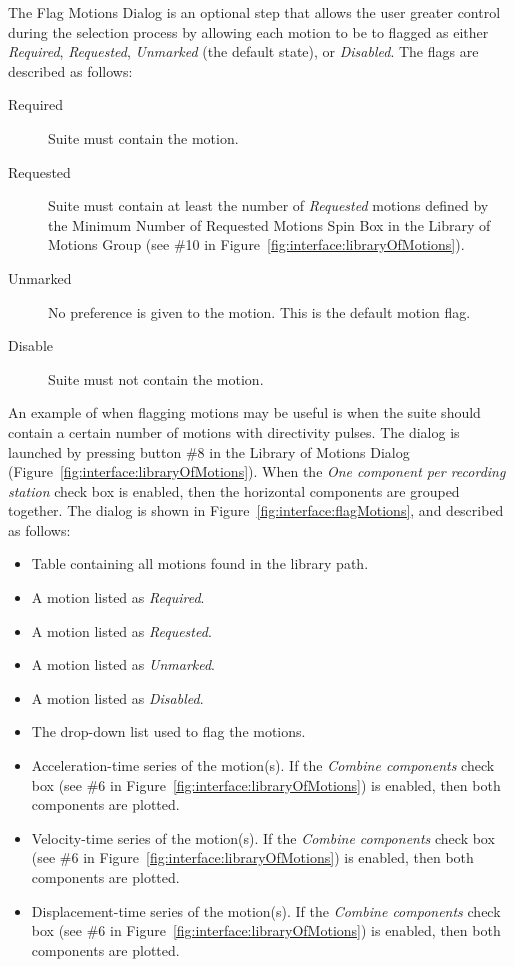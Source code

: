 \documentclass[11pt]{article}
\begin{document}
The Flag Motions Dialog is an optional step that allows the user greater
control during the selection process by allowing each motion to be to flagged as
either \emph{Required}, \emph{Requested}, \emph{Unmarked} (the default state), or
\emph{Disabled}. The flags are described as follows:
\begin{description}
  \item[Required] Suite must contain the motion.
  \item[Requested] Suite must contain at least the number of \emph{Requested} motions
	defined by the Minimum Number of Requested Motions Spin Box in the
	Library of Motions Group (see \#10 in
	Figure~\ref{fig:interface:libraryOfMotions}).
  \item[Unmarked] No preference is given to the motion. This is the default
	motion flag.
  \item[Disable] Suite must not contain the motion.
\end{description}
An example of when flagging motions may be useful is when the suite should
contain a certain number of motions with directivity pulses.  The dialog is
launched by pressing button \#8 in the Library of Motions Dialog
(Figure~\ref{fig:interface:libraryOfMotions}). When the
\emph{One component per recording station} check box is enabled, then the
horizontal components are grouped together. The dialog is shown in
Figure~\ref{fig:interface:flagMotions}, and described as follows:
\begin{itemize}
  \item Table containing all motions found in the library path.
  \item A motion listed as \emph{Required}.
  \item A motion listed as \emph{Requested}.
  \item A motion listed as \emph{Unmarked}.
  \item A motion listed as \emph{Disabled}.
  \item The drop-down list used to flag the motions.
  \item Acceleration-time series of the motion(s). If the \emph{Combine
	components} check box (see \#6 in
	Figure~\ref{fig:interface:libraryOfMotions}) is enabled, then both
	components are plotted.
  \item Velocity-time series of the motion(s). If the \emph{Combine components}
	check box (see \#6 in Figure~\ref{fig:interface:libraryOfMotions}) is
	enabled, then both components are plotted.
  \item Displacement-time series of the motion(s). If the \emph{Combine
	components} check box (see \#6 in
	Figure~\ref{fig:interface:libraryOfMotions}) is enabled, then both
	components are plotted.
\end{itemize}
\end{document}
